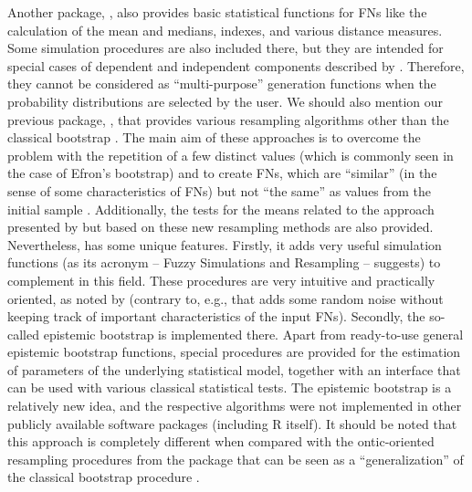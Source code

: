 Another package,  \citep{FuzzyStatTraMan}, also provides basic statistical functions for FNs like the calculation of the mean and medians, indexes, and various distance measures.
Some simulation procedures are also included there, but they are intended for special cases of dependent and independent components described by \cite{7295579}.
Therefore, they cannot be considered as ``multi-purpose'' generation functions when the probability distributions are selected by the user.
We should also mention our previous package,  \citep{FuzzyResampling}, that provides various resampling algorithms other than the classical bootstrap \citep{fuzzyResamplingArt}.
The main aim of these approaches is to overcome the problem with the repetition of a few distinct values (which is commonly seen in the case of Efron's bootstrap) and to create FNs, which are ``similar'' (in the sense of some characteristics of FNs) but not ``the same'' as values from the initial sample \citep{grzegorzewski_amcs2020,romaniuk_hryniewicz,GrzegorzewskiRom2021}.
Additionally, the tests for the means related to the approach presented by \cite{LUBIANO2016918} but based on these new resampling methods are also provided.
Nevertheless,  has some unique features.
Firstly, it adds very useful simulation functions (as its acronym -- Fuzzy Simulations and Resampling -- suggests) to complement  in this field.
These procedures are very intuitive and practically oriented, as noted by \cite{FRV} (contrary to, e.g.,  that adds some random noise without keeping track of important characteristics of the input FNs).
Secondly, the so-called epistemic bootstrap is implemented there.
Apart from ready-to-use general epistemic bootstrap functions, special procedures are provided for the estimation of parameters of the underlying statistical model, together with an interface that can be used with various classical statistical tests.
The epistemic bootstrap is a relatively new idea, and the respective algorithms were not implemented in other publicly available software packages (including R itself).
It should be noted that this approach is completely different when compared with the ontic-oriented resampling procedures from the  package that can be seen as a ``generalization'' of the classical bootstrap procedure \citep{grzegorzewski_amcs2020,GrzegorzewskiRom2021}.
